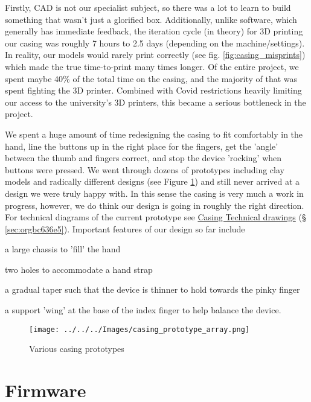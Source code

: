 \documentclass[logo,bsc,singlespacing,parskip]{infthesis}
\begin{document}
Firstly, CAD is not our specialist subject, so there was a lot to learn to build something that wasn't just a glorified box.
Additionally, unlike software, which generally has immediate feedback, the iteration cycle (in theory) for 3D printing our casing was roughly 7 hours to 2.5 days (depending on the machine/settings).
In reality, our models would rarely print correctly (see fig. \ref{fig:casing_misprints}) which made the true time-to-print many times longer.
Of the entire project, we spent maybe 40\% of the total time on the casing, and the majority of that was spent fighting the 3D printer.
Combined with Covid restrictions heavily limiting our access to the university's 3D printers, this became a serious bottleneck in the project.

We spent a huge amount of time redesigning the casing to fit comfortably in the hand, line the buttons up in the right place for the fingers, get the 'angle' between the thumb and fingers correct, and stop the device 'rocking' when buttons were pressed.
We went through dozens of prototypes including clay models and radically different designs (see Figure \ref{fig:casing_prototypes}) and still never arrived at a design we were truly happy with.
In this sense the casing is very much a work in progress, however, we do think our design is going in roughly the right direction.
For technical diagrams of the current prototype see
\hyperref[sec:orgbc636e5]{Casing Technical drawings} (§ \ref{sec:orgbc636e5}).
Important features of our design so far include
\begin{enumerate*}[label={\arabic*)}, itemjoin={, \,}, itemjoin*={, and \,}]
\item a large chassis to 'fill' the hand
\item two holes to accommodate a hand strap
\item a gradual taper such that the device is thinner to hold towards the pinky finger
\item a support 'wing' at the base of the index finger to help balance the device.
\end{enumerate*}

\begin{figure}[h]
\centering
\texttt{[image: ../../../Images/casing\_prototype\_array.png]}
\caption{\label{fig:casing_prototypes}Various casing prototypes}
\end{figure}
\section{Firmware}
\label{sec:orgec89891}
\end{document}
